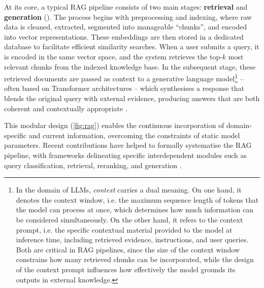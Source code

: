 \begin{spacing}{1.5}
At its core, a typical RAG pipeline consists of two main stages: \textbf{retrieval} and \textbf{generation} (\cite{odsc-community_retrieval-augmented_2024}). The process begins with preprocessing and indexing, where raw data is cleaned, extracted, segmented into manageable ``chunks'', and encoded into vector representations. These embeddings are then stored in a dedicated database to facilitate efficient similarity searches. When a user submits a query, it is encoded in the same vector space, and the system retrieves the top-$k$ most relevant chunks from the indexed knowledge base. In the subsequent stage, these retrieved documents are passed as context to a generative language model\footnote{In the domain of LLMs, \textit{context} carries a dual meaning. On one hand, it denotes the context window, i.e. the maximum sequence length of tokens that the model can process at once, which determines how much information can be considered simultaneously. On the other hand, it refers to the context prompt, i.e. the specific contextual material provided to the model at inference time, including retrieved evidence, instructions, and user queries. Both are critical in RAG pipelines, since the size of the context window constrains how many retrieved chunks can be incorporated, while the design of the context prompt influences how effectively the model grounds its outputs in external knowledge.} -- often based on Transformer architectures \citep{vaswani_attention_2017} -- which synthesises a response that blends the original query with external evidence, producing answers that are both coherent and contextually appropriate \citep{arslan_survey_2024}.

This modular design (\autoref{fig:rag}) enables the continuous incorporation of domain-specific and current information, overcoming the constraints of static model parameters. Recent contributions have helped to formally systematise the RAG pipeline, with frameworks delineating specific interdependent modules such as query classification, retrieval, reranking, and generation \parencite{wang_searching_2024,gao_retrieval-augmented_2024}.


\end{spacing}
